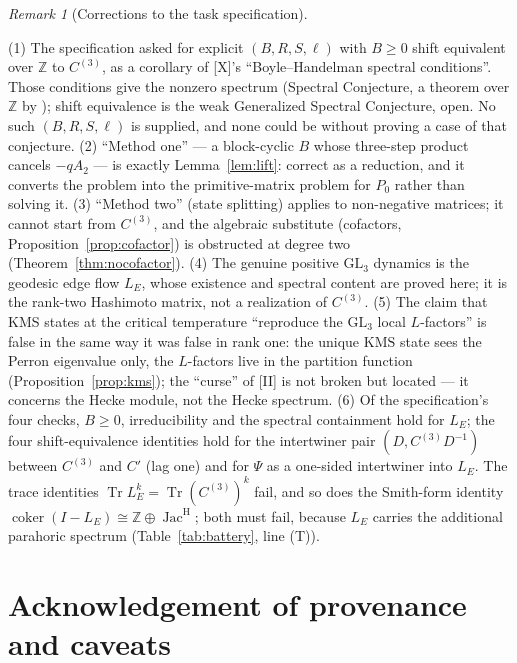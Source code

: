 \documentclass[11pt]{amsart}
\numberwithin{equation}{section}
\theoremstyle{definition}
\theoremstyle{remark}
\newtheorem{remark}[theorem]{Remark}
\newcommand{\Z}{\mathbb{Z}}
\newcommand{\Jac}{\operatorname{Jac}}
\newcommand{\coker}{\operatorname{coker}}
\newcommand{\Tr}{\operatorname{Tr}}
\newcommand{\JacH}{\Jac^{\mathrm{H}}}
\newcommand{\Cthree}{C^{(3)}}
\newcommand{\LE}{L_{E}}
\newcommand{\KMS}{\mathrm{KMS}}
\begin{document}
\begin{remark}[Corrections to the task specification]\label{rem:corrections}
\begin{sloppypar}
(1) The specification asked for explicit $(B,R,S,\ell)$ with $B\ge0$ shift equivalent over
$\Z$ to $\Cthree$, as a corollary of [X]'s ``Boyle--Handelman spectral conditions''. Those conditions give the nonzero spectrum
(Spectral Conjecture, a theorem over $\Z$ by \cite{KOR}); shift equivalence is the weak
Generalized Spectral Conjecture, open. No such $(B,R,S,\ell)$ is supplied, and none could
be without proving a case of that conjecture. (2) ``Method one'' --- a block-cyclic $B$
whose three-step product cancels $-qA_2$ --- is exactly Lemma~\ref{lem:lift}: correct as a
reduction, and it converts the problem into the primitive-matrix problem for $P_0$ rather
than solving it. (3) ``Method two'' (state splitting) applies to non-negative matrices; it
cannot start from $\Cthree$, and the algebraic substitute (cofactors,
Proposition~\ref{prop:cofactor}) is obstructed at degree two (Theorem~\ref{thm:nocofactor}).
(4) The genuine positive $\mathrm{GL}_3$ dynamics is the geodesic edge flow $\LE$, whose
existence and spectral content are proved here; it is the rank-two Hashimoto matrix, not a
realization of $\Cthree$. (5) The claim that KMS states at the critical temperature
``reproduce the $\mathrm{GL}_3$ local $L$-factors'' is false in the same way it was false in
rank one: the unique $\KMS$ state sees the Perron eigenvalue only, the $L$-factors live in
the partition function (Proposition~\ref{prop:kms}); the ``curse'' of [II] is not broken but
located --- it concerns the Hecke module, not the Hecke spectrum. (6) Of the specification's
four checks, $B\ge0$, irreducibility and the spectral containment hold for $\LE$; the four
shift-equivalence identities hold for the intertwiner pair $(D,\Cthree D^{-1})$ between
$\Cthree$ and $C'$ (lag one) and for $\Psi$ as a one-sided intertwiner into $\LE$. The trace
identities $\Tr\LE^{k}=\Tr(\Cthree)^{k}$ fail, and so does the Smith-form identity
$\coker(I-\LE)\cong\Z\oplus\JacH$; both must fail, because $\LE$ carries the additional
parahoric spectrum (Table~\ref{tab:battery}, line (T)).
\end{sloppypar}
\end{remark}

\section*{Acknowledgement of provenance and caveats}
\end{document}
